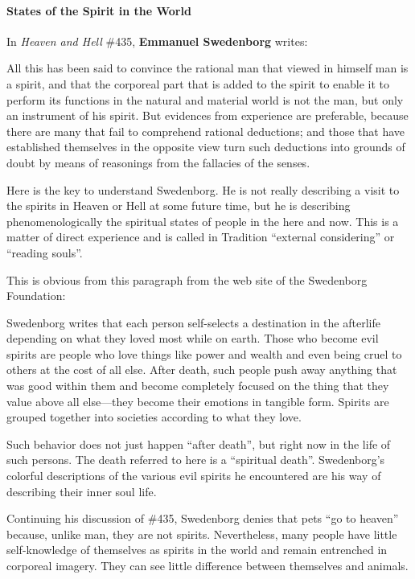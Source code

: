 \paragraph{States of the Spirit in the World}
In \emph{Heaven and Hell} \#435, \textbf{Emmanuel Swedenborg} writes:

\begin{quotex}
All this has been said to convince the rational man that viewed in himself man is a spirit, and that the corporeal part that is added to the spirit to enable it to perform its functions in the natural and material world is not the man, but only an instrument of his spirit. But evidences from experience are preferable, because there are many that fail to comprehend rational deductions; and those that have established themselves in the opposite view turn such deductions into grounds of doubt by means of reasonings from the fallacies of the senses. 

\end{quotex}
Here is the key to understand Swedenborg. He is not really describing a visit to the spirits in Heaven or Hell at some future time, but he is describing phenomenologically the spiritual states of people in the here and now. This is a matter of direct experience and is called in Tradition “external considering” or “reading souls”.

This is obvious from this paragraph from the web site of the Swedenborg Foundation:

\begin{quotex}
Swedenborg writes that each person self-selects a destination in the afterlife depending on what they loved most while on earth. Those who become evil spirits are people who love things like power and wealth and even being cruel to others at the cost of all else. After death, such people push away anything that was good within them and become completely focused on the thing that they value above all else—they become their emotions in tangible form. Spirits are grouped together into societies according to what they love.

\end{quotex}
Such behavior does not just happen “after death”, but right now in the life of such persons. The death referred to here is a “spiritual death”. Swedenborg's colorful descriptions of the various evil spirits he encountered are his way of describing their inner soul life.

Continuing his discussion of \#435, Swedenborg denies that pets “go to heaven” because, unlike man, they are not spirits. Nevertheless, many people have little self-knowledge of themselves as spirits in the world and remain entrenched in corporeal imagery. They can see little difference between themselves and animals.

